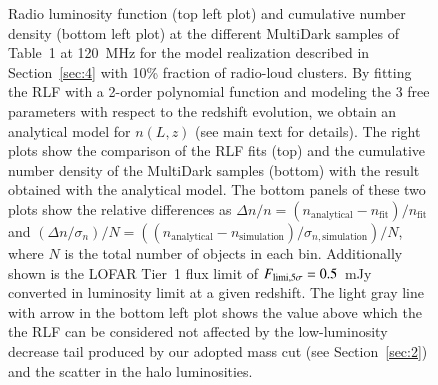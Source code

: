 \documentclass[traditabstract]{aa}
\newcommand{\rmn}{\mathrm}
\begin{document}
\begin{figure}[hbt!]
\caption{Radio luminosity function (top left plot) and cumulative number density (bottom left plot) at the different MultiDark samples of Table~1 at 120~MHz for the model realization described in Section~\ref{sec:4} with 10\% fraction of radio-loud clusters. By fitting the RLF with a 2-order polynomial function and modeling the 3 free parameters with respect to the redshift evolution, we obtain an analytical model for $n(L,z)$ (see main text for details). The right plots show the comparison of the RLF fits (top) and the cumulative number density of the MultiDark samples (bottom) with the result obtained with the analytical model. The bottom panels of these two plots show the relative differences as $\Delta n / n = (n_{\rmn{analytical}} - n_{\rmn{fit}})/n_{\rmn{fit}}$ and $(\Delta n / \sigma_{n})/N = ((n_{\rmn{analytical}} - n_{\rmn{simulation}})/\sigma_{n,\rmn{simulation}})/N$, where $N$ is the total number of objects in each bin. Additionally shown is the LOFAR Tier~1 flux limit of $F_{\rm{limi},5\sigma}=0.5$~mJy \citep{2012JApA..tmp...34R} converted in luminosity limit at a given redshift. The light gray line with arrow in the bottom left plot shows the value above which the the RLF can be considered not affected by the low-luminosity decrease tail produced by our adopted mass cut (see Section~\ref{sec:2}) and the scatter in the halo luminosities.}
\label{fig:RLF_120}
\end{figure}
\end{document}
